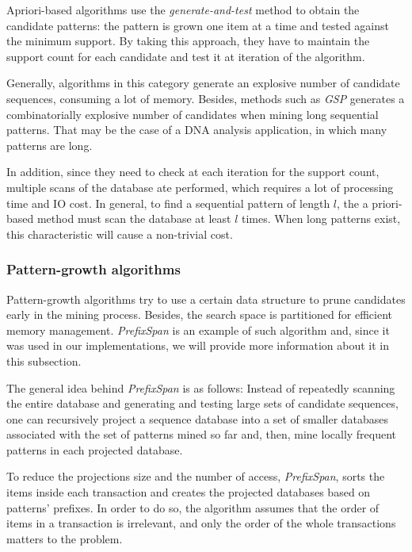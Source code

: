Apriori-based algorithms use the \textit{generate-and-test} method to obtain the candidate patterns: the pattern is grown one item at a time and tested against the minimum support. By taking this approach, they have to maintain the support count for each candidate and test it at iteration of the algorithm.

Generally, algorithms in this category generate an explosive number of candidate sequences, consuming a lot of memory. Besides,  methods such as \textit{GSP} generates a combinatorially explosive number of candidates when mining long sequential patterns. That may be the case of a DNA analysis application, in which many patterns are long.

In addition, since they need to check at each iteration for the support count, multiple scans of the database ate performed, which requires a lot of processing time and IO cost. In general, to find a sequential pattern of length $l$, the a priori-based method must scan the database at least $l$ times. When long patterns exist, this characteristic will cause a non-trivial cost.

\subsubsection{Pattern-growth algorithms}

Pattern-growth algorithms try to use a certain data structure to prune candidates early in the mining process. Besides, the search space is partitioned for efficient memory management. \textit{PrefixSpan}\cite{Pei} is an example of such algorithm and, since it was used in our implementations, we will provide more information about it in this subsection.

The general idea behind \textit{PrefixSpan} is as follows: Instead of repeatedly scanning the entire database and generating and testing large sets of candidate sequences, one can recursively project a sequence database into a set of smaller databases associated with the set of patterns mined so far and, then, mine locally frequent patterns in each projected database\cite{Pei}.

To reduce the projections size and the number of access, \textit{PrefixSpan}, sorts the items inside each transaction and creates the projected databases based on patterns' prefixes. In order to do so, the algorithm assumes that the order of items in a transaction is irrelevant, and only the order of the whole transactions matters to the problem.

